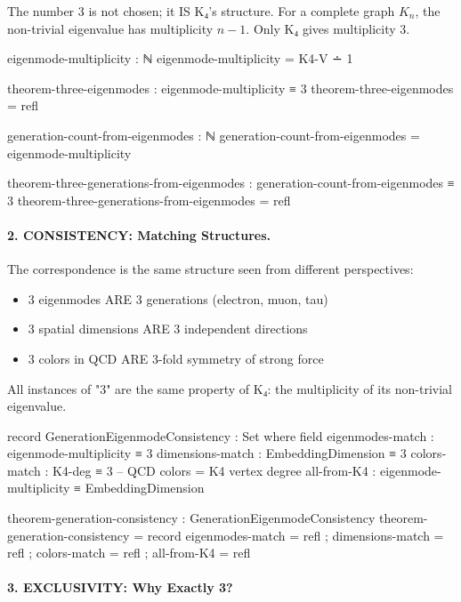 \documentclass[11pt,a4paper]{book}
\begin{document}
The number 3 is not chosen; it IS K₄'s structure. For a complete graph $K_n$, the non-trivial eigenvalue has multiplicity $n-1$. Only K₄ gives multiplicity 3.

\begin{code}
eigenmode-multiplicity : ℕ
eigenmode-multiplicity = K4-V ∸ 1

theorem-three-eigenmodes : eigenmode-multiplicity ≡ 3
theorem-three-eigenmodes = refl

generation-count-from-eigenmodes : ℕ
generation-count-from-eigenmodes = eigenmode-multiplicity

theorem-three-generations-from-eigenmodes : generation-count-from-eigenmodes ≡ 3
theorem-three-generations-from-eigenmodes = refl
\end{code}

\paragraph{2. CONSISTENCY: Matching Structures.}

The correspondence is the same structure seen from different perspectives:
\begin{itemize}
\item 3 eigenmodes ARE 3 generations (electron, muon, tau)
\item 3 spatial dimensions ARE 3 independent directions
\item 3 colors in QCD ARE 3-fold symmetry of strong force
\end{itemize}

All instances of "3" are the same property of K₄: the multiplicity of its non-trivial eigenvalue.

\begin{code}
record GenerationEigenmodeConsistency : Set where
  field
    eigenmodes-match : eigenmode-multiplicity ≡ 3
    dimensions-match : EmbeddingDimension ≡ 3
    colors-match     : K4-deg ≡ 3  -- QCD colors = K4 vertex degree
    all-from-K4      : eigenmode-multiplicity ≡ EmbeddingDimension

theorem-generation-consistency : GenerationEigenmodeConsistency
theorem-generation-consistency = record
  { eigenmodes-match = refl
  ; dimensions-match = refl
  ; colors-match     = refl
  ; all-from-K4      = refl
  }
\end{code}

\paragraph{3. EXCLUSIVITY: Why Exactly 3?}
\end{document}
